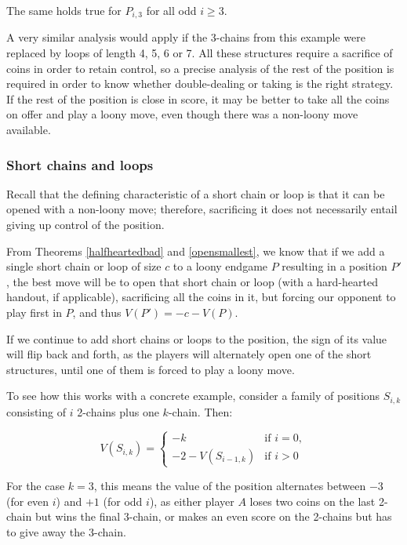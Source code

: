 \documentclass[a4paper,twocolumn]{article}
\begin{document}
The same holds true for $P_{i,3}$ for all odd $i \ge 3$.

A very similar analysis would apply if the 3-chains from this example
were replaced by loops of length 4, 5, 6 or 7. All these structures
require a sacrifice of coins in order to retain control, so a precise
analysis of the rest of the position is required in order to know
whether double-dealing or taking is the right strategy. If the rest of
the position is close in score, it may be better to take all the coins
on offer and play a loony move, even though there was a non-loony move
available.

\subsubsection{Short chains and loops}

Recall that the defining characteristic of a short chain or loop is
that it can be opened with a non-loony move; therefore, sacrificing it
does not necessarily entail giving up control of the position.

From Theorems \ref{halfheartedbad} and \ref{opensmallest}, we know
that if we add a single short chain or loop of size $c$ to a loony
endgame $P$ resulting in a position $P'$, the best move will be to
open that short chain or loop (with a hard-hearted handout, if
applicable), sacrificing all the coins in it, but forcing our opponent
to play first in $P$, and thus $V(P') = -c-V(P)$.

If we continue to add short chains or loops to the position, the sign
of its value will flip back and forth, as the players will alternately
open one of the short structures, until one of them is forced to play
a loony move.

To see how this works with a concrete example, consider a family of
positions $S_{i,k}$ consisting of $i$ 2-chains plus one
$k$-chain. Then:

\begin{equation*}
  V(S_{i,k}) =
  \begin{cases}
    -k & \text{if } i = 0,\\
    -2-V(S_{i-1,k}) & \text{if } i > 0
  \end{cases}
\end{equation*}

For the case $k=3$, this means the value of the position alternates
between $-3$ (for even $i$) and $+1$ (for odd $i$), as either player
$A$ loses two coins on the last 2-chain but wins the final 3-chain, or
makes an even score on the 2-chains but has to give away the 3-chain.
\end{document}
